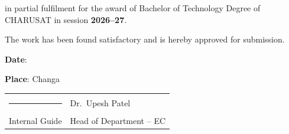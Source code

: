 \documentclass[a4paper,11pt,oneside]{book}
\begin{document}
    in partial fulfilment for the award of Bachelor of Technology Degree of CHARUSAT in session \textbf{2026--27}.

    \vspace{0.5cm}

    The work has been found satisfactory and is hereby approved for submission.

    \vspace{1cm}

    \textbf{Date}: \underline{\hspace{2.5cm}}

    \vspace{0.4cm}

    \textbf{Place}: Changa

    \vspace{2.2cm}

    \begin{tabular}{>{\centering\arraybackslash}p{}
                    >{\centering\arraybackslash}p{}}

    \rule{5cm}{0.4pt} &
    Dr.\ Upesh Patel \\

    Internal Guide &
    Head of Department -- EC \\

    \end{tabular}

    
    

    \tableofcontents
    \listoffigures
    \listoftables
    

    \mainmatter

    
    
    
    
    
    
    
    
    
    

    \nocite{*}
    

    \begin{appendices}
        
    \end{appendices}
\end{document}
